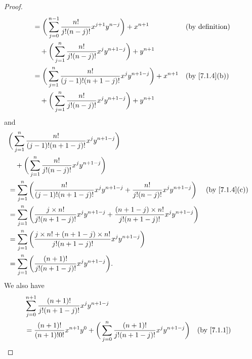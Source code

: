 \begin{proof}
\begin{align*}
                    & = \bigg(\sum_{j = 0}^{n - 1} \dfrac{n!}{j!(n - j)!} x^{j + 1} y^{n - j}\bigg) + x^{n + 1}   &  & \text{(by definition)}           \\
                    & \quad + \bigg(\sum_{j = 1}^n \dfrac{n!}{j!(n - j)!} x^j y^{n + 1 - j}\bigg) + y^{n + 1}                                           \\
                    & = \bigg(\sum_{j = 1}^n \dfrac{n!}{(j - 1)!(n + 1 - j)!} x^j y^{n + 1 - j}\bigg) + x^{n + 1} &  & \text{(by \cref{7.1.4}(b))}      \\
                    & \quad + \bigg(\sum_{j = 1}^n \dfrac{n!}{j!(n - j)!} x^j y^{n + 1 - j}\bigg) + y^{n + 1}
  \end{align*}
  and
  \begin{align*}
     & \bigg(\sum_{j = 1}^n \dfrac{n!}{(j - 1)!(n + 1 - j)!} x^j y^{n + 1 - j}\bigg)                                                                                                         \\
     & \quad + \bigg(\sum_{j = 1}^n \dfrac{n!}{j!(n - j)!} x^j y^{n + 1 - j}\bigg)                                                                                                           \\
     & = \sum_{j = 1}^n \bigg(\dfrac{n!}{(j - 1)!(n + 1 - j)!} x^j y^{n + 1 - j} + \dfrac{n!}{j!(n - j)!} x^j y^{n + 1 - j}\bigg)                           &  & \text{(by \cref{7.1.4}(c))} \\
     & = \sum_{j = 1}^n \bigg(\dfrac{j \times n!}{j!(n + 1 - j)!} x^j y^{n + 1 - j} + \dfrac{(n + 1 - j) \times n!}{j!(n + 1 - j)!} x^j y^{n + 1 - j}\bigg)                                  \\
     & = \sum_{j = 1}^n \bigg(\dfrac{j \times n! + (n + 1 - j) \times n!}{j!(n + 1 - j)!} x^j y^{n + 1 - j}\bigg)                                                                            \\
     & = \sum_{j = 1}^n \bigg(\dfrac{(n + 1)!}{j!(n + 1 - j)!} x^j y^{n + 1 - j}\bigg).
  \end{align*}
  We also have
  \begin{align*}
     & \sum_{j = 0}^{n + 1} \dfrac{(n + 1)!}{j!(n + 1 - j)!} x^j y^{n + 1 - j}                                                                                        \\
     & = \dfrac{(n + 1)!}{(n + 1)! 0!} x^{n + 1} y^0 + \bigg(\sum_{j = 0}^n \dfrac{(n + 1)!}{j!(n + 1 - j)!} x^j y^{n + 1 - j}\bigg) &  & \text{(by \cref{7.1.1})}    \\

\end{align*}
\end{proof}
